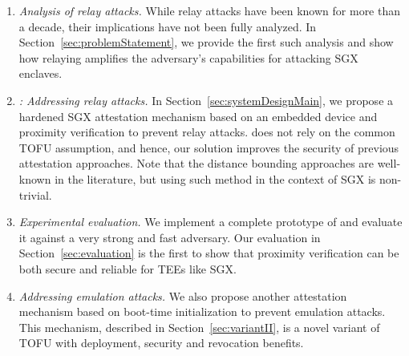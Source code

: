 \begin{enumerate}
    \item \emph{Analysis of relay attacks.} While relay attacks have been known for more than a decade, their implications have not been fully analyzed. In Section~\ref{sec:problemStatement}, we provide the first such analysis and show how relaying amplifies the adversary's capabilities for attacking SGX enclaves.   

    \item \emph{\name: Addressing relay attacks.} In Section~\ref{sec:systemDesignMain}, we propose a hardened SGX attestation mechanism based on an embedded device and proximity verification to prevent relay attacks. \name does not rely on the common TOFU assumption, and hence, our solution improves the security of previous attestation approaches. Note that the distance bounding approaches are well-known in the literature, but using such method in the context of SGX is non-trivial.
    
    \item \emph{Experimental evaluation.} We implement a complete prototype of \name and evaluate it against a very strong and fast adversary. Our evaluation in Section~\ref{sec:evaluation} is the first to show that proximity verification can be both secure and reliable for TEEs like SGX.
    
    \item \emph{Addressing emulation attacks.} We also propose another attestation mechanism based on boot-time initialization to prevent emulation attacks. This mechanism, described in Section~\ref{sec:variantII}, is a novel variant of TOFU with deployment, security and revocation benefits.
\end{enumerate}


